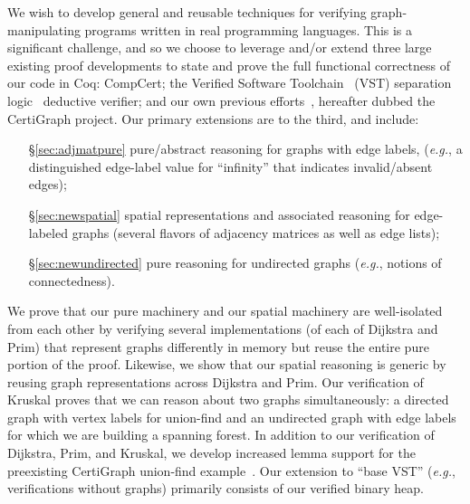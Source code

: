 We wish to develop general and reusable techniques for verifying graph-manipulating programs written in real programming languages.  This is a significant challenge, and so we choose to leverage and/or extend three large existing proof developments to state and prove the full functional correctness of our code in Coq: CompCert; the Verified Software Toolchain~\cite{appel:programlogics} (VST) separation logic~\cite{o2001local} deductive verifier; and our own previous efforts~\cite{DBLP:journals/pacmpl/WangCMH19}, hereafter dubbed the CertiGraph project.  Our primary extensions are to the third, and include:
\vspace*{-0.25em}
\begin{enumerate}
\item[\S\ref{sec:adjmatpure}] pure/abstract reasoning for graphs with edge labels,
(\emph{e.g.}, a distinguished edge-label value for ``infinity'' that indicates invalid/absent edges);
\item[\S\ref{sec:newspatial}] spatial representations and associated reasoning for edge-labeled graphs (several flavors of adjacency matrices as well as edge lists);
\item[\S\ref{sec:newundirected}] pure reasoning for undirected graphs (\emph{e.g.}, notions of connectedness).
\end{enumerate}
\vspace*{-0.25em}
We prove that our pure machinery and our spatial machinery are well-isolated from each other by verifying several implementations (of each of Dijkstra and Prim) that represent graphs differently in memory but reuse the entire pure portion of the proof.  Likewise, we show that our spatial reasoning is generic by reusing graph representations across Dijkstra and Prim.  Our verification of Kruskal proves that we can reason about two graphs simultaneously: a directed graph with vertex labels for union-find and an undirected graph with edge labels for which we are building a spanning forest.
In addition to our verification of Dijkstra, Prim, and Kruskal, we develop increased lemma support for the preexisting CertiGraph union-find example~\cite{DBLP:journals/pacmpl/WangCMH19}.  Our extension to ``base VST'' (\emph{e.g.}, verifications without graphs) primarily consists of our verified binary heap.


